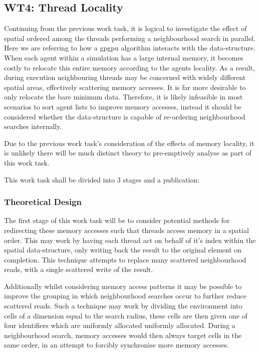     \subsection{WT4: Thread Locality}
      Continuing from the previous work task, it is logical to investigate the effect of spatial ordered among the threads performing a neighbourhood search in parallel. Here we are referring to how a \gls{gpgpu} algorithm interacts with the data-structure. When each agent within a simulation has a large internal memory, it becomes costly to relocate this entire memory according to the agents locality. As a result, during execution neighbouring threads may be concerned with widely different spatial areas, effectively scattering memory accesses. It is far more desirable to only relocate the bare minimum data. Therefore, it is likely infeasible in most scenarios to sort agent lists to improve memory accesses, instead it should be considered whether the data-structure is capable of re-ordering neighbourhood searches internally. 
      
      Due to the previous work task's consideration of the effects of memory locality, it is unlikely there will be much distinct theory to pre-emptively analyse as part of this work task.

      This work task shall be divided into 3 stages and a publication:
      \subsubsection*{Theoretical Design}
        The first stage of this work task will be to consider potential methods for redirecting these memory accesses such that threads access memory in a spatial order. This may work by having each thread act on behalf of it's index within the spatial data-structure, only writing back the result to the original element on completion. This technique attempts to replace many scattered neighbourhood reads, with a single scattered write of the result.
        
        Additionally whilst considering memory access patterns it may be possible to improve the grouping in which neighbourhood searches occur to further reduce scattered reads. Such a technique may work by dividing the environment into cells of a dimension equal to the search radius, these cells are then given one of four identifiers which are uniformly allocated uniformly allocated. During a neighbourhood search, memory accesses would then always target cells in the same order, in an attempt to forcibly synchronise more memory accesses.
        
